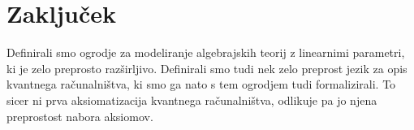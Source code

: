 \section{Zaključek}

Definirali smo ogrodje za modeliranje algebrajskih teorij z linearnimi parametri,
ki je zelo preprosto razširljivo.
Definirali smo tudi nek zelo preprost jezik za opis kvantnega računalništva, ki smo ga nato s tem ogrodjem tudi formalizirali.
To sicer ni prva aksiomatizacija kvantnega računalništva, odlikuje pa jo njena preprostost nabora aksiomov.
